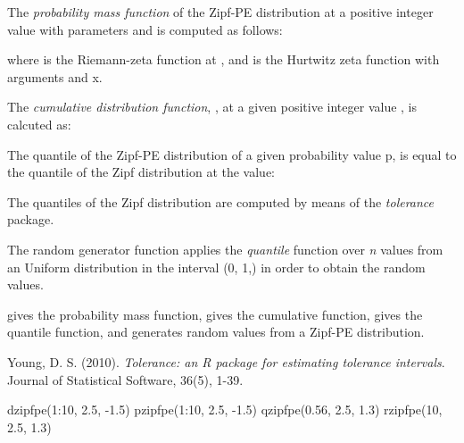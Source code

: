 \documentclass[letterpaper]{book}
\begin{document}
%
\begin{Details}\relax
The \emph{probability mass function} of the Zipf-PE distribution at a positive integer
value  with parameters \eqn{\alpha}{} and \eqn{\beta}{} is computed as follows:


where \eqn{\zeta(\alpha)}{} is the Riemann-zeta function at \eqn{\alpha}{}, and 
is the Hurtwitz zeta function with arguments \eqn{\alpha}{} and x.

The \emph{cumulative distribution function}, , at a given positive integer value ,
is calcuted as:

The quantile of the Zipf-PE\eqn{(\alpha, \beta)}{} distribution of a given probability value p,
is equal to the quantile of the Zipf\eqn{(\alpha)}{} distribution at the value:

The quantiles of the Zipf\eqn{(\alpha)}{} distribution are computed by means of the \emph{tolerance}
package.

The random generator function applies the \emph{quantile} function over \emph{n} values
from an Uniform distribution in the interval (0, 1,) in order to obtain
the random values.
\end{Details}
%
\begin{Value}

 gives the probability mass function,
 gives the cumulative function,
 gives the quantile function, and
 generates random values from a Zipf-PE distribution.  
\end{Value}
%
\begin{References}\relax

Young, D. S. (2010). \emph{Tolerance: an R package for estimating tolerance intervals}. Journal of Statistical Software, 36(5), 1-39.

\end{References}
%
\begin{Examples}
\begin{ExampleCode}
dzipfpe(1:10, 2.5, -1.5)
pzipfpe(1:10, 2.5, -1.5)
qzipfpe(0.56, 2.5, 1.3)
rzipfpe(10, 2.5, 1.3)

\end{ExampleCode}
\end{Examples}
\end{document}
